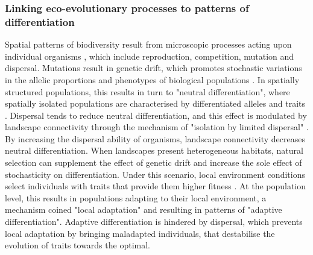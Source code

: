 \subsubsection{Linking eco-evolutionary processes to patterns of differentiation}
Spatial patterns of biodiversity result from microscopic processes acting upon individual organisms \cite{Champagnat2006}, which include reproduction, competition, mutation and dispersal.
% 
Mutations result in genetic drift, which promotes stochastic variations in the allelic proportions and phenotypes of biological populations \xxx. In spatially structured populations, this results in turn to "neutral differentiation", where spatially isolated populations are characterised by differentiated alleles and traits \xxx. 
% 
Dispersal tends to reduce neutral differentiation, and this effect is modulated by landscape connectivity \cite{Wright1943,McRae2006,McRae2007} through the mechanism of "isolation by limited dispersal" \cite{Orsini2013}. By increasing the dispersal ability of organisms, landscape connectivity decreases neutral differentiation.
% 
When landscapes present heterogeneous habitats, natural selection can supplement the effect of genetic drift and increase the sole effect of stochasticity on differentiation. Under this scenario, local environment conditions select individuals with traits that provide them higher fitness \xxx. At the population level, this results in populations adapting to their local environment, a mechanism coined "local adaptation" \cite{Kawecki2004} and resulting in patterns of "adaptive differentiation". 
% 
% 
Adaptive differentiation is hindered by dispersal, which prevents local adaptation by bringing maladapted individuals, that destabilise the evolution of traits towards the optimal.
% 
% 
